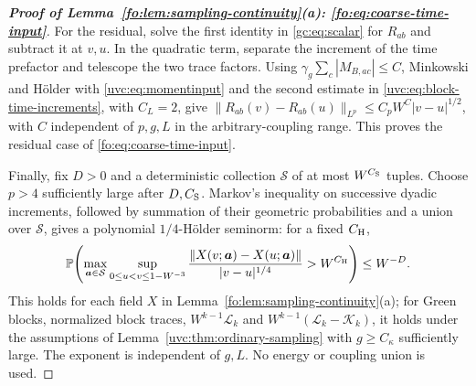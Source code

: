 \documentclass[11pt]{article}
\numberwithin{equation}{section}
\theoremstyle{remark}
\newcommand{\Prob}{\mathbb P}
\newcommand{\cL}{\mathcal L}
\newcommand{\cK}{\mathcal K}
\begin{document}
\begin{proof}[\textbf{Proof of Lemma~\ref{fo:lem:sampling-continuity}(a): \eqref{fo:eq:coarse-time-input}}]
For the residual, solve the first identity in \eqref{gc:eq:scalar} for
$R_{ab}$ and subtract it at $v,u$. In the quadratic term, separate the
increment of the time prefactor and telescope the two trace factors.
Using $\gamma_g\sum_c|M_{B,ac}|\le C$, Minkowski and H\"older with
\eqref{uvc:eq:momentinput} and the second estimate in
\eqref{uvc:eq:block-time-increments}, with $C_L=2$, give
$\|R_{ab}(v)-R_{ab}(u)\|_{L^p}\le C_{p}W^{C}|v-u|^{1/2}$,
with $C$ independent of $p,g,L$ in the arbitrary-coupling range.
This proves the residual case of \eqref{fo:eq:coarse-time-input}.

Finally, fix $D>0$ and a deterministic collection $\mathcal S$ of at most
$W^{C_{\rm S}}$ tuples. Choose $p>4$ sufficiently large after $D,C_{\rm S}$.
Markov's inequality on successive dyadic increments, followed by summation
of their geometric probabilities and a union over $\mathcal S$, gives
a polynomial $1/4$-H\"older seminorm: for a fixed $C_{\rm H}$,
\begin{equation}\label{uvc:eq:time-holder-envelope}
 \Prob\!\left(
 \max_{\boldsymbol a\in\mathcal S}
 \sup_{0\le u<v\le1-W^{-3}}
 \frac{\|X(v;\boldsymbol a)-X(u;\boldsymbol a)\|}{|v-u|^{1/4}}
 >W^{C_{\rm H}}\right)\le W^{-D}.
\end{equation}
This holds for each field $X$ in Lemma~\ref{fo:lem:sampling-continuity}(a);
for Green blocks, normalized block traces, $W^{k-1}\cL_k$ and $W^{k-1}(\cL_k-\cK_k)$, it
holds under the assumptions of Lemma~\ref{uvc:thm:ordinary-sampling}
with $g\ge C_\kappa$ sufficiently large.
The exponent is independent of $g,L$. No energy or coupling union is used.
\end{proof}
\end{document}
